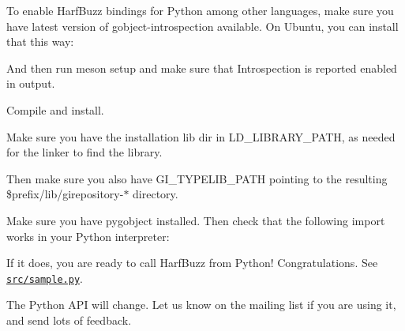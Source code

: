 To enable Harf\+Buzz bindings for Python among other languages, make sure you have latest version of gobject-\/introspection available. On Ubuntu, you can install that this way\+:


\begin{DoxyCode}{0}

\end{DoxyCode}


And then run {\ttfamily meson setup} and make sure that {\ttfamily Introspection} is reported enabled in output.

Compile and install.

Make sure you have the installation lib dir in {\ttfamily LD\+\_\+\+LIBRARY\+\_\+\+PATH}, as needed for the linker to find the library.

Then make sure you also have {\ttfamily GI\+\_\+\+TYPELIB\+\_\+\+PATH} pointing to the resulting {\ttfamily \$prefix/lib/girepository-\/$\ast$} directory.

Make sure you have pygobject installed. Then check that the following import works in your Python interpreter\+:


\begin{DoxyCode}{0}

\end{DoxyCode}


If it does, you are ready to call Harf\+Buzz from Python! Congratulations. See \href{src/sample.py}{\texttt{ {\ttfamily src/sample.\+py}}}.

The Python API will change. Let us know on the mailing list if you are using it, and send lots of feedback. 